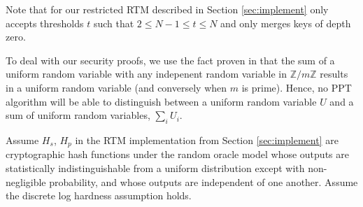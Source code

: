 \documentclass[12pt,english,oneside]{mrl}
\theoremstyle{definition}
\numberwithin{equation}{section}
\numberwithin{figure}{section}
\numberwithin{equation}{section}
\numberwithin{equation}{section}
\numberwithin{figure}{section}
\begin{document}
 Note that for our restricted RTM described in Section \ref{sec:implement} only accepts thresholds $t$ such that $2 \leq N-1 \leq t \leq N$ and only merges keys of depth zero. 
 
 To deal with our security proofs, we use the  fact proven in \cite{scozzafava1993uniform} that the sum of a uniform random variable with any indepenent random variable in $\mathbb{Z}/m\mathbb{Z}$ results in a uniform random variable (and conversely when $m$ is prime). Hence, no PPT algorithm will be able to distinguish between a uniform random variable $U$ and a sum of uniform random variables, $\sum_i U_i$.
 
 Assume $H_s$, $H_p$ in the RTM implementation from Section \ref{sec:implement} are cryptographic hash functions under the random oracle model whose outputs are statistically indistinguishable from a uniform distribution except with non-negligible probability, and whose outputs are independent of one another. Assume the discrete log hardness assumption holds.
 
\end{document}

